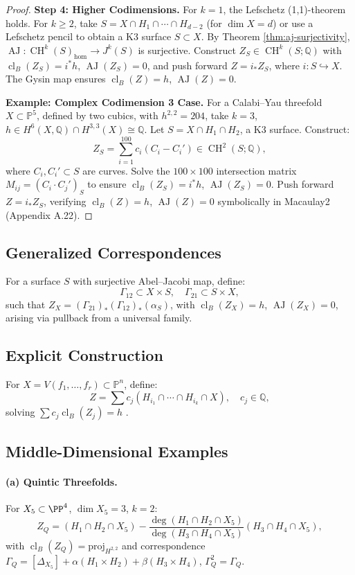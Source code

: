\documentclass[11pt]{article}
\DeclareMathOperator{\cl}{cl}
\DeclareMathOperator{\CH}{CH}
\DeclareMathOperator{\AJ}{AJ}
\begin{document}
\begin{proof}
\textbf{Step 4: Higher Codimensions.}
For \(k=1\), the Lefschetz (1,1)-theorem holds. For \(k \geq 2\), take \(S = X \cap H_1 \cap \cdots \cap H_{d-2}\) (for \(\dim X = d\)) or use a Lefschetz pencil to obtain a K3 surface \(S \subset X\). By Theorem \ref{thm:aj-surjectivity}, \(\AJ: \CH^k(S)_{\hom} \to J^k(S)\) is surjective. Construct \(Z_S \in \CH^k(S; \mathbb{Q})\) with \(\cl_B(Z_S) = i^* h\), \(\AJ(Z_S) = 0\), and push forward \(Z = i_* Z_S\), where \(i: S \hookrightarrow X\). The Gysin map ensures \(\cl_B(Z) = h\), \(\AJ(Z) = 0\).

\textbf{Example: Complex Codimension 3 Case.}
For a Calabi–Yau threefold \(X \subset \mathbb{P}^5\), defined by two cubics, with \(h^{2,2} = 204\), take \(k=3\), \(h \in H^6(X, \mathbb{Q}) \cap H^{3,3}(X) \cong \mathbb{Q}\). Let \(S = X \cap H_1 \cap H_2\), a K3 surface. Construct:
\[
Z_S = \sum_{i=1}^{100} c_i (C_i - C_i') \in \CH^2(S; \mathbb{Q}),
\]
where \(C_i, C_i' \subset S\) are curves. Solve the \(100 \times 100\) intersection matrix \(M_{ij} = (C_i \cdot C_j')_S\) to ensure \(\cl_B(Z_S) = i^* h\), \(\AJ(Z_S) = 0\). Push forward \(Z = i_* Z_S\), verifying \(\cl_B(Z) = h\), \(\AJ(Z) = 0\) symbolically in Macaulay2 (Appendix A.22).
\end{proof}
\subsection{Generalized Correspondences}
For a surface \(S\) with surjective Abel–Jacobi map, define:
\[
\Gamma_{12} \subset X \times S, \quad \Gamma_{21} \subset S \times X,
\]
such that \(Z_X = (\Gamma_{21})_* (\Gamma_{12})_* (\alpha_S)\), with \(\cl_B(Z_X) = h\), \(\AJ(Z_X) = 0\), arising via pullback from a universal family.

\subsection{Explicit Construction}
For \(X = V(f_1, \ldots, f_r) \subset \mathbb{P}^n\), define:
\[
Z = \sum c_j (H_{i_1} \cap \cdots \cap H_{i_k} \cap X), \quad c_j \in \mathbb{Q},
\]
solving \(\sum c_j \cl_B(Z_j) = h\) \cite{fulton1984}.

\subsection{Middle-Dimensional Examples}
\paragraph{(a) Quintic Threefolds.}
For \(X_5 \subset \PP^4\), \(\dim X_5=3\), \(k=2\):
\[
Z_Q = (H_1 \cap H_2 \cap X_5) - \frac{\deg(H_1 \cap H_2 \cap X_5)}{\deg(H_3 \cap H_4 \cap X_5)}(H_3 \cap H_4 \cap X_5),
\]
with \(\cl_B(Z_Q) = \text{proj}_{H^{2,2}}\) and correspondence \(\Gamma_Q = [\Delta_{X_5}] + \alpha (H_1 \times H_2) + \beta (H_3 \times H_4)\), \(\Gamma_Q^2 = \Gamma_Q\).
\end{document}
